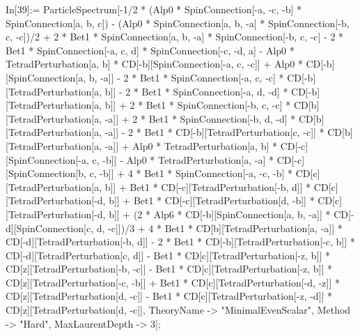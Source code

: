 In[39]:= ParticleSpectrum[-1/2 * (Alp0 * SpinConnection[-a, -c, -b] * SpinConnection[a, b, c]) - (Alp0 * SpinConnection[a, b, -a] * SpinConnection[-b, c, -c])/2 + 2 * Bet1 * SpinConnection[a, b, -a] * SpinConnection[-b, c, -c] - 2 * Bet1 * SpinConnection[-a, c, d] * SpinConnection[-c, -d, a] - Alp0 * TetradPerturbation[a, b] * CD[-b][SpinConnection[-a, c, -c]] + Alp0 * CD[-b][SpinConnection[a, b, -a]] - 2 * Bet1 * SpinConnection[-a, c, -c] * CD[-b][TetradPerturbation[a, b]] - 2 * Bet1 * SpinConnection[-a, d, -d] * CD[-b][TetradPerturbation[a, b]] + 2 * Bet1 * SpinConnection[-b, c, -c] * CD[b][TetradPerturbation[a, -a]] + 2 * Bet1 * SpinConnection[-b, d, -d] * CD[b][TetradPerturbation[a, -a]] - 2 * Bet1 * CD[-b][TetradPerturbation[c, -c]] * CD[b][TetradPerturbation[a, -a]] + Alp0 * TetradPerturbation[a, b] * CD[-c][SpinConnection[-a, c, -b]] - Alp0 * TetradPerturbation[a, -a] * CD[-c][SpinConnection[b, c, -b]] + 4 * Bet1 * SpinConnection[-a, -c, -b] * CD[c][TetradPerturbation[a, b]] + Bet1 * CD[-c][TetradPerturbation[-b, d]] * CD[c][TetradPerturbation[-d, b]] + Bet1 * CD[-c][TetradPerturbation[d, -b]] * CD[c][TetradPerturbation[-d, b]] + (2 * Alp6 * CD[-b][SpinConnection[a, b, -a]] * CD[-d][SpinConnection[c, d, -c]])/3 + 4 * Bet1 * CD[b][TetradPerturbation[a, -a]] * CD[-d][TetradPerturbation[-b, d]] - 2 * Bet1 * CD[-b][TetradPerturbation[-c, b]] * CD[-d][TetradPerturbation[c, d]] - Bet1 * CD[c][TetradPerturbation[-z, b]] * CD[z][TetradPerturbation[-b, -c]] - Bet1 * CD[c][TetradPerturbation[-z, b]] * CD[z][TetradPerturbation[-c, -b]] + Bet1 * CD[c][TetradPerturbation[-d, -z]] * CD[z][TetradPerturbation[d, -c]] - Bet1 * CD[c][TetradPerturbation[-z, -d]] * CD[z][TetradPerturbation[d, -c]], TheoryName -> "MinimalEvenScalar", Method -> "Hard", MaxLaurentDepth -> 3]; 